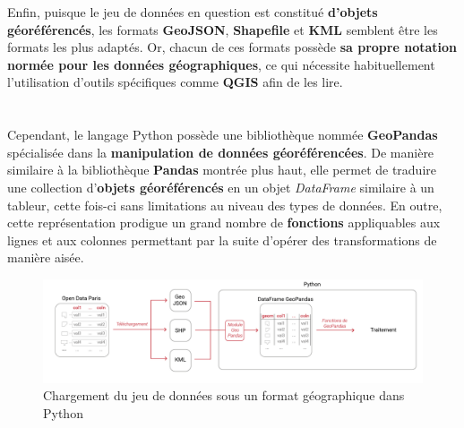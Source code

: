 \documentclass[
  11pt,
  french,
]{article}
\begin{document}
Enfin, puisque le jeu de données en question est constitué
\textbf{d'objets géoréférencés}, les formats \textbf{GeoJSON},
\textbf{Shapefile} et \textbf{KML} semblent être les formats les plus
adaptés. Or, chacun de ces formats possède \textbf{sa propre notation
normée pour les données géographiques}, ce qui nécessite habituellement
l'utilisation d'outils spécifiques comme \textbf{QGIS} afin de les
lire.\\
~\\
~\\
Cependant, le langage Python possède une bibliothèque nommée
\textbf{GeoPandas} spécialisée dans la \textbf{manipulation de données
géoréférencées}. De manière similaire à la bibliothèque \textbf{Pandas}
montrée plus haut, elle permet de traduire une collection
d'\textbf{objets géoréférencés} en un objet \emph{DataFrame} similaire à
un tableur, cette fois-ci sans limitations au niveau des types de
données. En outre, cette représentation prodigue un grand nombre de
\textbf{fonctions} appliquables aux lignes et aux colonnes permettant
par la suite d'opérer des transformations de manière aisée.

\begin{tcolorbox}
\begin{figure}

{\centering \includegraphics[width=0.9\linewidth]{__imgs/io_gpd} 

}

\caption[Chargement du jeu de données sous un format géographique dans Python  -  réalisation personnelle]{Chargement du jeu de données sous un format géographique dans Python}\label{fig:io_gpd}
\end{figure}
\end{tcolorbox}
\end{document}
